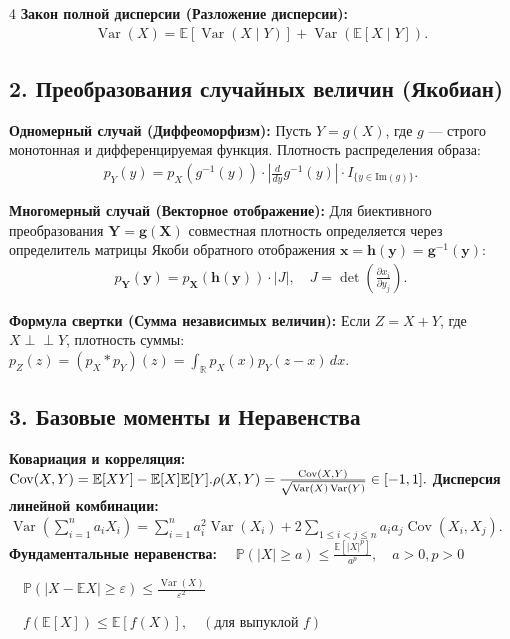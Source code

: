 \documentclass[a4paper, landscape]{article}
\newcommand{\E}{\mathbb{E}}
\renewcommand{\P}{\mathbb{P}}
\DeclareMathOperator{\Var}{Var}
\DeclareMathOperator{\Cov}{Cov}
\begin{document}
\begin{multicols*}{4}
\textbf{Закон полной дисперсии (Разложение дисперсии):}
\begin{gather*}
    \Var(X) = \E[\Var(X \mid Y)] + \Var(\E[X \mid Y]).
\end{gather*}

\subsection*{2. Преобразования случайных величин (Якобиан)}
\textbf{Одномерный случай (Диффеоморфизм):}
Пусть $Y = g(X)$, где $g$ — строго монотонная и дифференцируемая функция. Плотность распределения образа:
\begin{gather*}
    p_Y(y) = p_X(g^{-1}(y)) \cdot \left| \frac{d}{dy} g^{-1}(y) \right| \cdot I_{\{y \in \text{Im}(g)\}}.
\end{gather*}

\textbf{Многомерный случай (Векторное отображение):}
Для биективного преобразования $\mathbf{Y} = \mathbf{g}(\mathbf{X})$ совместная плотность определяется через определитель матрицы Якоби обратного отображения $\mathbf{x} = \mathbf{h}(\mathbf{y}) = \mathbf{g}^{-1}(\mathbf{y})$:
\begin{gather*}
    p_{\mathbf{Y}}(\mathbf{y}) = p_{\mathbf{X}}(\mathbf{h}(\mathbf{y})) \cdot |J|, \quad J = \det \left( \frac{\partial x_i}{\partial y_j} \right).
\end{gather*}

\textbf{Формула свертки (Сумма независимых величин):}
Если $Z = X + Y$, где $X \perp\!\!\perp Y$, плотность суммы:
$
    p_Z(z) = (p_X * p_Y)(z) = \int_{\mathbb{R}} p_X(x) p_Y(z - x) \, dx.
$

\subsection*{3. Базовые моменты и Неравенства}
\textbf{Ковариация и корреляция:}
$
    \Cov(X, Y) = \E[XY] - \E[X]\E[Y]. \\
    \rho(X, Y) = \frac{\Cov(X, Y)}{\sqrt{\Var(X)\Var(Y)}} \in [-1, 1].
$
\textbf{Дисперсия линейной комбинации:}
$
    \Var\left(\sum_{i=1}^n a_i X_i\right) = \sum_{i=1}^n a_i^2 \Var(X_i) + 2 \sum_{1 \le i < j \le n} a_i a_j \Cov(X_i, X_j).
$
\textbf{Фундаментальные неравенства:}
     $\quad \P(|X| \ge a) \le \frac{\E[|X|^p]}{a^p}, \quad a>0, p>0$

     $\quad \P(|X - \E X| \ge \varepsilon) \le \frac{\Var(X)}{\varepsilon^2}$

     $\quad f(\E[X]) \le \E[f(X)], \quad (\text{для выпуклой } f)$


\end{multicols*}
\end{document}
